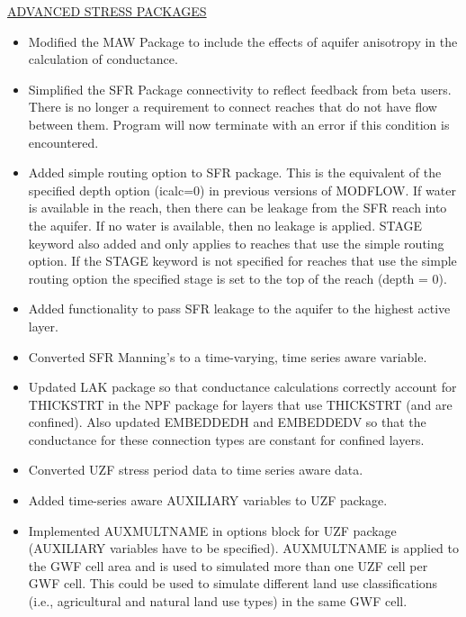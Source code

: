 \begin{itemize}
	\underline{ADVANCED STRESS PACKAGES}
	\begin{itemize}
		\item Modified the MAW Package to include the effects of aquifer anisotropy in the calculation of conductance.
		\item Simplified the SFR Package connectivity to reflect feedback from beta users. There is no longer a requirement to connect reaches that do not have flow between them.  Program will now terminate with an error if this condition is encountered.
		\item Added simple routing option to SFR package. This is the equivalent of the specified depth option (icalc=0) in previous versions of MODFLOW. If water is available in the reach, then there can be leakage from the SFR reach into the aquifer.  If no water is available, then no leakage is applied.  STAGE keyword also added and only applies to reaches that use the simple routing option. If the STAGE keyword is not specified for reaches that use the simple routing option the specified stage is set to the top of the reach (depth = 0).
		\item Added functionality to pass SFR leakage to the aquifer to the highest active layer.
		\item Converted SFR Manning's to a time-varying, time series aware variable.  
		\item Updated LAK package so that conductance calculations correctly account for THICKSTRT in the NPF package for layers that use THICKSTRT (and are confined). Also updated EMBEDDEDH and EMBEDDEDV so that the conductance for these connection types are constant for confined layers.
		\item Converted UZF stress period data to time series aware data.
		\item Added time-series aware AUXILIARY variables to UZF package.
		\item Implemented AUXMULTNAME in options block for UZF package (AUXILIARY variables have to be specified). AUXMULTNAME is applied to the GWF cell area and is used to simulated more than one UZF cell per GWF cell. This could be used to simulate different land use classifications (i.e., agricultural and natural land use types) in the same GWF cell.
	\end{itemize}
	

\end{itemize}
